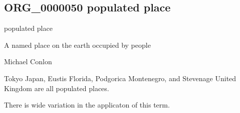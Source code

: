 \documentclass[letterpaper,10pt,english]{sphinxmanual}
\begin{document}
\subsection{ORG\_0000050 \sphinxhyphen{} populated place}
\label{\detokenize{doc-ORG_0000050:org-0000050-populated-place}}\label{\detokenize{doc-ORG_0000050:index-0}}\label{\detokenize{doc-ORG_0000050::doc}}
\begin{sphinxShadowBox}

\sphinxAtStartPar
populated place
\end{sphinxShadowBox}

\begin{sphinxShadowBox}

\sphinxAtStartPar
{\hyperref[\detokenize{doc-ORG_0000045::doc}]{}}
\end{sphinxShadowBox}

\begin{sphinxShadowBox}

\sphinxAtStartPar
A named place on the earth occupied by people
\end{sphinxShadowBox}

\begin{sphinxShadowBox}

\sphinxAtStartPar
Michael Conlon 
\end{sphinxShadowBox}

\begin{sphinxShadowBox}

\sphinxAtStartPar
Tokyo Japan, Eustis Florida, Podgorica Montenegro, and Stevenage United Kingdom are all populated places.
\end{sphinxShadowBox}

\begin{sphinxShadowBox}

\sphinxAtStartPar
There is wide variation in the applicaton of this term.
\end{sphinxShadowBox}

\begin{sphinxShadowBox}

\sphinxAtStartPar
{}
\end{sphinxShadowBox}
\end{document}
